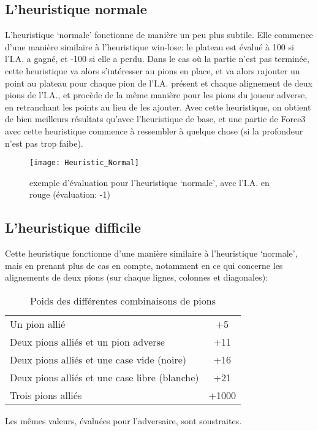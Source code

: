 \subsection{L'heuristique normale}

L'heuristique `normale' fonctionne de manière un peu plus subtile. Elle commence d'une manière similaire
à l'heuristique win-lose: le plateau est évalué à 100 si l'I.A. a gagné, et -100 si elle a perdu.
Dans le cas où la partie n'est pas terminée, cette heuristique va alors s'intéresser au pions en place,
et va alors rajouter un point au plateau pour chaque pion de l'I.A. présent et chaque alignement de deux
pions de l'I.A., et procède de la même manière pour les pions du joueur adverse, en retranchant les points
au lieu de les ajouter. Avec cette heuristique, on obtient de bien meilleurs résultats qu'avec l'heuristique
de base, et une partie de Force3 avec cette heuristique commence à ressembler à quelque chose (si la
profondeur n'est pas trop faibe).

\begin{figure}[H]
    \centering
    \texttt{[image: Heuristic\_Normal]}{}
    \caption{exemple d'évaluation pour l'heuristique `normale', avec l'I.A. en rouge (évaluation: -1)}
\end{figure}
\subsection{L'heuristique difficile}

Cette heuristique fonctionne d'une manière similaire à l'heuristique `normale', mais en prenant plus de
cas en compte, notamment en ce qui concerne les alignements de deux pions (sur chaque lignes, colonnes et diagonales):

\begin{table}[H]
    \begin{tabular}{lc}
        Un pion allié                                 & +5    \\
        Deux pions alliés et un pion adverse          & +11   \\
        Deux pions alliés et une case vide (noire)    & +16   \\
        Deux pions alliés et une case libre (blanche) & +21   \\
        Trois pions alliés                            & +1000 \\
    \end{tabular}
    \caption{Poids des différentes combinaisons de pions}
\end{table}
Les mêmes valeurs, évaluées pour l'adversaire, sont soustraites.

